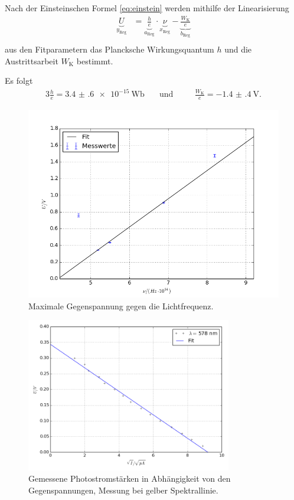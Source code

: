 Nach der Einsteinschen Formel \eqref{eq:einstein}
werden mithilfe der Linearisierung
\begin{align}
	\underbrace{U}_{y_\text{Reg}} &= \underbrace{\frac{h}{e}}_{a_\text{Reg}}\cdot\underbrace{\nu}_{x_\text{Reg}} - \underbrace{\frac{W_\text{K}}{e}}_{b_\text{Reg}}\\
\end{align}
aus den Fitparametern das Plancksche Wirkungsquantum $h$ und die Austrittsarbeit $W_\text{K}$ bestimmt.

Es folgt
\begin{alignat}{3}
	\frac{h}{e}=\SI{3.4(6)e-15}{\weber} \quad&\text{und} \quad&&\frac{W_\text{K}}{e}= \SI{-1.4(4)}{\volt}.
\end{alignat}
\begin{figure}[H]
	\centering
	\includegraphics[width=\textwidth]{Bilder/unu_diag.png}
	\caption{Maximale Gegenspannung gegen die Lichtfrequenz. \cite{matplotlib}}
	\label{fig:unu}
\end{figure}
\newpage
\begin{figure}[p]
	\centering
	\includegraphics[width=0.8\textwidth]{Bilder/Fit_gelb.png}
	\caption{Gemessene Photostromstärken in Abhängigkeit von den Gegenspannungen, Messung bei gelber Spektrallinie.\cite{matplotlib}}
	\label{fig:uidiagramm1}
\end{figure}
